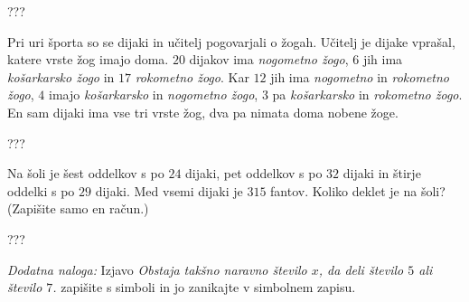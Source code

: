 \documentclass[addpoints,12pt]{exam}
\begin{document}
\begin{questions}

    \begin{solution}[9cm]
        ???
            \end{solution}


    \newpage
    \question
    Pri uri športa so se dijaki in učitelj pogovarjali o žogah.  Učitelj je dijake vprašal, katere vrste žog imajo doma.
    $20$ dijakov ima \textit{nogometno žogo}, $6$ jih ima \textit{košarkarsko žogo} in $17$ \textit{rokometno žogo}. Kar $12$ jih ima \textit{nogometno} in \textit{rokometno žogo}, $4$ imajo \textit{košarkarsko} in \textit{nogometno žogo},
    $3$ pa \textit{košarkarsko} in \textit{rokometno žogo}. En sam dijaki ima vse tri vrste žog, dva pa nimata doma nobene žoge. 

    \begin{solution}[8cm]
        ???
            \end{solution}




    \newpage
        

    \question[3]
    Na šoli je šest oddelkov s po $24$ dijaki, pet oddelkov s po $32$ dijaki in štirje oddelki s po $29$ dijaki. 
    Med vsemi dijaki je $315$ fantov. Koliko deklet je na šoli? (Zapišite samo en račun.)

    \begin{solution}[11cm]
        ???
            \end{solution}

    
    \bonusquestion[3]
    \textit{Dodatna naloga:} Izjavo \textit{Obstaja takšno naravno število $x$, da deli število $5$ ali število $7$.} zapišite s simboli in jo zanikajte v simbolnem zapisu.

\end{questions}
\end{document}
